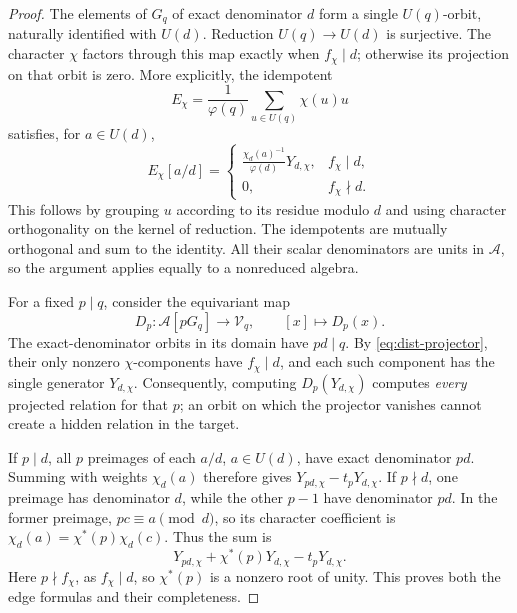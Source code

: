 \begin{proof}
The elements of \(G_q\) of exact denominator \(d\) form a single
\(U(q)\)-orbit, naturally identified with \(U(d)\). Reduction
\(U(q)\to U(d)\) is surjective. The character \(\chi\) factors through
this map exactly when \(f_\chi\mid d\); otherwise its projection on
that orbit is zero. More explicitly, the idempotent
\[
 E_\chi=\frac1{\varphi(q)}\sum_{u\in U(q)}\chi(u)u
\]
satisfies, for \(a\in U(d)\),
\begin{equation}
 E_\chi[a/d]=
 \begin{cases}
 \displaystyle\frac{\chi_d(a)^{-1}}{\varphi(d)}Y_{d,\chi},
       &f_\chi\mid d,\\[6pt]
 0,&f_\chi\nmid d.
 \end{cases}
 \label{eq:dist-projector}
\end{equation}
This follows by grouping \(u\) according to its residue modulo \(d\)
and using character orthogonality on the kernel of reduction.
The idempotents are mutually orthogonal and sum to the identity.
All their scalar denominators are units in \(\mathcal A\), so the
argument applies equally to a nonreduced algebra.

For a fixed \(p\mid q\), consider the equivariant map
\[
 D_p:\mathcal A[pG_q]\longrightarrow\mathcal V_q,\qquad
 [x]\longmapsto D_p(x).
\]
The exact-denominator orbits in its domain have \(pd\mid q\).
By \eqref{eq:dist-projector}, their only nonzero \(\chi\)-components
have \(f_\chi\mid d\), and each such component has the single
generator \(Y_{d,\chi}\). Consequently, computing
\(D_p(Y_{d,\chi})\) computes \emph{every} projected relation for
that \(p\); an orbit on which the projector vanishes cannot create
a hidden relation in the target.

If \(p\mid d\), all \(p\) preimages of each \(a/d\), \(a\in U(d)\),
have exact denominator \(pd\). Summing with weights \(\chi_d(a)\)
therefore gives \(Y_{pd,\chi}-t_pY_{d,\chi}\).
If \(p\nmid d\), one preimage has denominator \(d\), while the other
\(p-1\) have denominator \(pd\). In the former preimage,
\(pc\equiv a\pmod d\), so its character coefficient is
\(\chi_d(a)=\chi^*(p)\chi_d(c)\). Thus the sum is
\[
 Y_{pd,\chi}+\chi^*(p)Y_{d,\chi}-t_pY_{d,\chi}.
 \]
Here \(p\nmid f_\chi\), as \(f_\chi\mid d\), so \(\chi^*(p)\)
is a nonzero root of unity. This proves both the edge formulas
and their completeness.
\end{proof}

